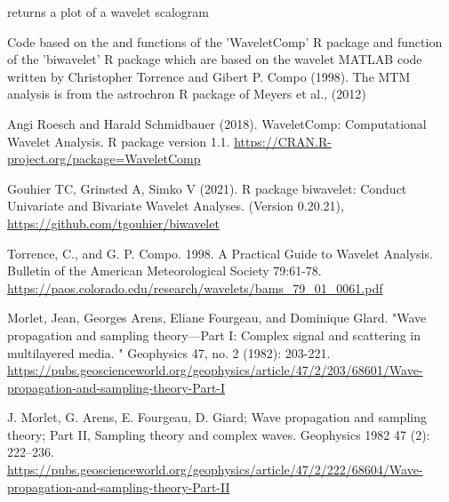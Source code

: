 \documentclass[a4paper]{book}
\begin{document}
%
\begin{Value}
returns a plot of a wavelet scalogram
\end{Value}
%
\begin{Author}
Code based on the  and  functions of the 'WaveletComp' R package
and  function of the 'biwavelet' R package which are based on the
wavelet MATLAB code written by Christopher Torrence and Gibert P. Compo (1998).
The MTM analysis is from the astrochron R package of Meyers et al., (2012)
\end{Author}
%
\begin{References}
Angi Roesch and Harald Schmidbauer (2018). WaveletComp: Computational
Wavelet Analysis. R package version 1.1.
\url{https://CRAN.R-project.org/package=WaveletComp}

Gouhier TC, Grinsted A, Simko V (2021). R package biwavelet: Conduct Univariate and Bivariate Wavelet Analyses. (Version 0.20.21),
\url{https://github.com/tgouhier/biwavelet}

Torrence, C., and G. P. Compo. 1998. A Practical Guide to Wavelet Analysis.
Bulletin of the American Meteorological Society 79:61-78.
\url{https://paos.colorado.edu/research/wavelets/bams_79_01_0061.pdf}

Morlet, Jean, Georges Arens, Eliane Fourgeau, and Dominique Glard.
"Wave propagation and sampling theory—Part I: Complex signal and scattering in multilayered media.
" Geophysics 47, no. 2 (1982): 203-221.
\url{https://pubs.geoscienceworld.org/geophysics/article/47/2/203/68601/Wave-propagation-and-sampling-theory-Part-I}

J. Morlet, G. Arens, E. Fourgeau, D. Giard;
Wave propagation and sampling theory; Part II, Sampling theory and complex waves.
Geophysics 1982 47 (2): 222–236. \url{https://pubs.geoscienceworld.org/geophysics/article/47/2/222/68604/Wave-propagation-and-sampling-theory-Part-II}
\end{References}
%
\end{document}
